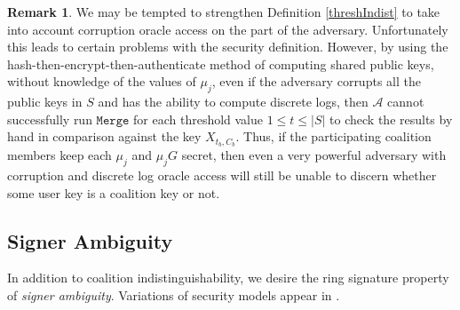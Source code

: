 \documentclass{mrl}
\theoremstyle{definition}
\newtheorem{disc}[theorem]{Remark}
\begin{document}
 \begin{disc}
 We may be tempted to strengthen Definition \ref{threshIndist} to take into account corruption oracle access on the part of the adversary. Unfortunately this leads to certain problems with the security definition.   However, by using the hash-then-encrypt-then-authenticate method of computing shared public keys, without knowledge of the values of $\mu_j$, even if the adversary corrupts all the public keys in $S$ and has the ability to compute discrete logs, then $\mathcal{A}$ cannot successfully run $\texttt{Merge}$ for each threshold value $1 \leq t \leq \left|S\right|$ to check the results by hand in comparison against the key $X_{t_b,C_b}$.  Thus, if the participating coalition members keep each $\mu_j$ and $\mu_j G$ secret, then even a very powerful adversary with corruption and discrete log oracle access will still be unable to discern whether some user key is a coalition key or not.
 \end{disc}


\subsection{Signer Ambiguity}

In addition to coalition indistinguishability, we desire the ring signature property of \textit{signer ambiguity}. Variations of security models appear in \cite{bender2006ring}. 
\end{document}
